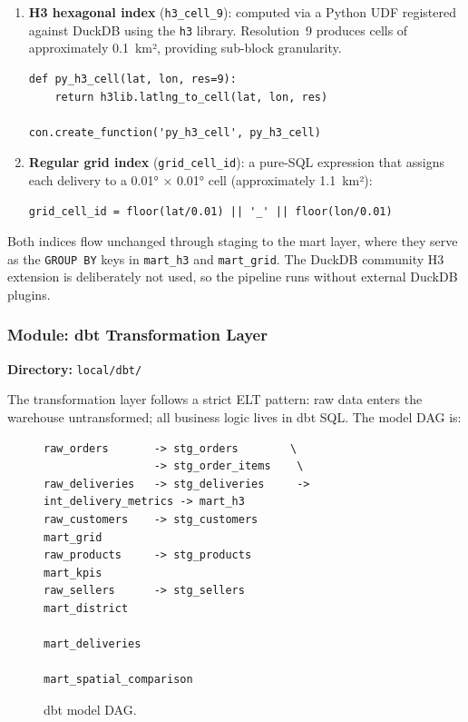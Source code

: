 \begin{enumerate}
  \item \textbf{H3 hexagonal index} (\texttt{h3\_cell\_9}): computed via a Python UDF
        registered against DuckDB using the \texttt{h3} library. Resolution~9 produces
        cells of approximately 0.1~km², providing sub-block granularity.

        \begin{verbatim}
def py_h3_cell(lat, lon, res=9):
    return h3lib.latlng_to_cell(lat, lon, res)

con.create_function('py_h3_cell', py_h3_cell)
        \end{verbatim}

  \item \textbf{Regular grid index} (\texttt{grid\_cell\_id}): a pure-SQL expression
        that assigns each delivery to a 0.01° × 0.01° cell (approximately 1.1~km²):

        \begin{verbatim}
grid_cell_id = floor(lat/0.01) || '_' || floor(lon/0.01)
        \end{verbatim}
\end{enumerate}

Both indices flow unchanged through staging to the mart layer, where they serve as the
\texttt{GROUP BY} keys in \texttt{mart\_h3} and \texttt{mart\_grid}. The DuckDB community
H3 extension is deliberately not used, so the pipeline runs without external DuckDB plugins.

\subsubsection{Module: dbt Transformation Layer}
\label{sec:dbt}

\textbf{Directory:} \texttt{local/dbt/}

The transformation layer follows a strict ELT pattern: raw data enters the warehouse
untransformed; all business logic lives in dbt SQL. The model DAG is:

\begin{figure}[H]
\centering
\begin{verbatim}
raw_orders       -> stg_orders        \
                 -> stg_order_items    \
raw_deliveries   -> stg_deliveries     -> int_delivery_metrics -> mart_h3
raw_customers    -> stg_customers                                mart_grid
raw_products     -> stg_products                                 mart_kpis
raw_sellers      -> stg_sellers                                  mart_district
                                                                 mart_deliveries
                                                                 mart_spatial_comparison
\end{verbatim}
\caption{dbt model DAG.}
\label{fig:dbt_dag}
\end{figure}

